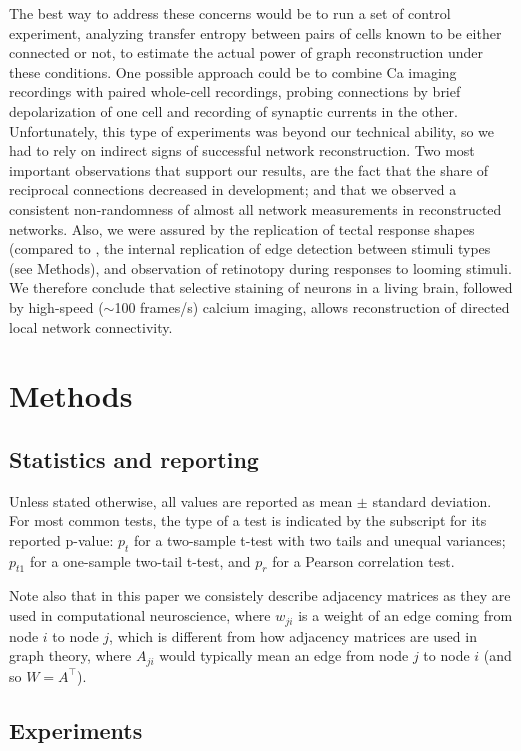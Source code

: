 \documentclass{article}
\begin{document}
The best way to address these concerns would be to run a set of control experiment, analyzing transfer entropy between pairs of cells known to be either connected or not, to estimate the actual power of graph reconstruction under these conditions. One possible approach could be to combine Ca imaging recordings with paired whole-cell recordings, probing connections by brief depolarization of one cell and recording of synaptic currents in the other. Unfortunately, this type of experiments was beyond our technical ability, so we had to rely on indirect signs of successful network reconstruction. Two most important observations that support our results, are the fact that the share of reciprocal connections decreased in development; and that we observed a consistent non-randomness of almost all network measurements in reconstructed networks. Also, we were assured by the replication of tectal response shapes (compared to \citep{khakhalin2014}, the internal replication of edge detection between stimuli types (see Methods), and observation of retinotopy during responses to looming stimuli. We therefore conclude that selective staining of neurons in a living brain, followed by high-speed ($\sim$100 frames/s) calcium imaging, allows reconstruction of directed local network connectivity.

\section*{Methods}

\subsection*{Statistics and reporting}

Unless stated otherwise, all values are reported as mean $\pm$ standard deviation. For most common tests, the type of a test is indicated by the subscript for its reported p-value: $p_t$ for a two-sample t-test with two tails and unequal variances; $p_{t1}$ for a one-sample two-tail t-test, and $p_r$ for a Pearson correlation test.

Note also that in this paper we consistely describe adjacency matrices as they are used in computational neuroscience, where $w_{ji}$ is a weight of an edge coming from node $i$ to node $j$, which is different from how adjacency matrices are used in graph theory, where $A_{ji}$ would typically mean an edge from node $j$ to node $i$ (and so $W = A^\top$).

\subsection*{Experiments}
\end{document}
